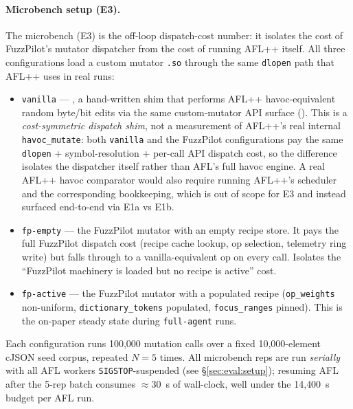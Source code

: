 \documentclass[11pt]{article}
\begin{document}
\paragraph{Microbench setup (E3).}
The microbench (E3) is the off-loop dispatch-cost number: it isolates
the cost of FuzzPilot's mutator dispatcher from the cost of running
AFL++ itself. All three configurations load a custom mutator
\texttt{.so} through the same \texttt{dlopen} path that AFL++ uses
in real runs:

\begin{itemize}
  \item \texttt{vanilla} --- ,
  a hand-written shim that performs AFL++ havoc-equivalent random
  byte/bit edits via the same custom-mutator API surface
  ().
  This is a \emph{cost-symmetric dispatch shim}, not a measurement of
  AFL++'s real internal \texttt{havoc\_mutate}: both \texttt{vanilla}
  and the FuzzPilot configurations pay the same
  \texttt{dlopen} + symbol-resolution + per-call API dispatch cost,
  so the difference isolates the dispatcher itself rather than
  AFL's full havoc engine. A real AFL++ havoc comparator would also
  require running AFL++'s scheduler and the corresponding bookkeeping,
  which is out of scope for E3 and instead surfaced end-to-end via
  E1a vs E1b.
  \item \texttt{fp-empty} --- the FuzzPilot mutator with an empty
  recipe store. It pays the full FuzzPilot dispatch cost (recipe
  cache lookup, op selection, telemetry ring write) but falls
  through to a vanilla-equivalent op on every call. Isolates the
  ``FuzzPilot machinery is loaded but no recipe is active'' cost.
  \item \texttt{fp-active} --- the FuzzPilot mutator with a populated
  recipe (\texttt{op\_weights} non-uniform, \texttt{dictionary\_tokens}
  populated, \texttt{focus\_ranges} pinned). This is the on-paper
  steady state during \texttt{full-agent} runs.
\end{itemize}

Each configuration runs 100{,}000 mutation calls over a fixed
10{,}000-element cJSON seed corpus, repeated $N=5$ times. All
microbench reps are run \emph{serially} with all AFL workers
\texttt{SIGSTOP}-suspended (see \S\ref{sec:eval:setup}); resuming
AFL after the 5-rep batch consumes $\approx 30$~s of wall-clock,
well under the 14{,}400~s budget per AFL run.
\end{document}

